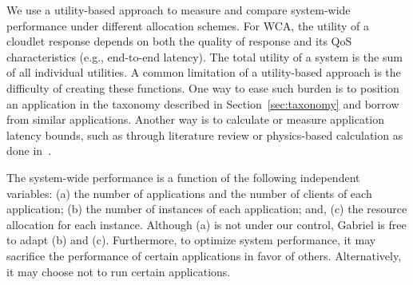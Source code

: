 We use a utility-based approach to measure and compare system-wide
performance under different allocation schemes. For WCA, the utility
of a cloudlet response depends on both the quality of response and its
QoS characteristics (e.g., end-to-end latency). The total utility of a
system is the sum of all individual utilities. A common limitation of
a utility-based approach is the difficulty of creating these
functions. One way to ease such burden is to position an application
in the taxonomy described in Section~\ref{sec:taxonomy} and borrow
from similar applications. Another way is to calculate or measure
application latency bounds, such as through literature review or
physics-based calculation as done in~\cite{chen2017empirical}.

The system-wide performance is a function of the following independent
variables: (a) the number of applications and the number of clients of
each application; (b) the number of instances of each application;
and, (c) the resource allocation for each instance.  Although (a) is
not under our control, Gabriel is free to adapt (b) and (c).
Furthermore, to optimize system performance, it may sacrifice the
performance of certain applications in favor of others.
Alternatively, it may choose not to run certain applications.


